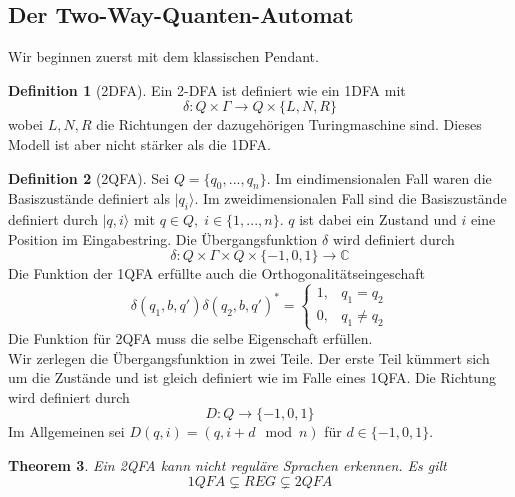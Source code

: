 \documentclass[a4paper, 12pt]{article}
\theoremstyle{plain}
\newtheorem{theorem}{Theorem}[section] %
\theoremstyle{definition}
\newtheorem{definition}[theorem]{Definition} %
\theoremstyle{lemma}
\theoremstyle{remark}
\theoremstyle{example}
\begin{document}
	\subsection{Der Two-Way-Quanten-Automat}
	Wir beginnen zuerst mit dem klassischen Pendant.
	\begin{definition}[2DFA]
		Ein 2-DFA ist definiert wie ein 1DFA mit \[\delta: Q\times \Gamma \to Q\times \{L,N,R\}\] wobei $L,N,R$ die Richtungen der dazugehörigen Turingmaschine sind. Dieses Modell ist aber nicht stärker als die 1DFA. 
	\end{definition}
	\begin{definition}[2QFA]
		Sei $Q = \{q_0,...,q_n\}$. Im eindimensionalen Fall waren die Basiszustände definiert als $|q_i\rangle$. Im zweidimensionalen Fall sind die Basiszustände definiert durch $|q,i\rangle$ mit $q\in Q, \; i \in \{1,...,n\}$. $q$ ist dabei ein Zustand und $i$ eine Position im Eingabestring. Die Übergangsfunktion $\delta$ wird definiert durch \[\delta: Q \times \Gamma \times Q\times \{-1,0,1\} \to \mathbb{C}\]
		Die Funktion der 1QFA erfüllte auch die Orthogonalitätseingeschaft \[\delta(q_1,b,q')\delta(q_2,b,q')^* = \begin{cases}
			1, & q_1 = q_2\\
			0, & q_1\neq q_2
		\end{cases}\]
		Die Funktion für 2QFA muss die selbe Eigenschaft erfüllen.\\
		Wir zerlegen die Übergangsfunktion in zwei Teile. Der erste Teil kümmert sich um die Zustände und ist gleich definiert wie im Falle eines 1QFA. Die Richtung wird definiert durch \[D:Q\to \{-1,0,1\}\]
		Im Allgemeinen sei $D(q,i) = (q,i+d \mod n)$ für $d \in \{-1,0,1\}$. 
	\end{definition}
	\begin{theorem}
		Ein 2QFA kann nicht reguläre Sprachen erkennen. Es gilt \[1QFA \subsetneq REG \subsetneq 2QFA\]
	\end{theorem}
\end{document}
